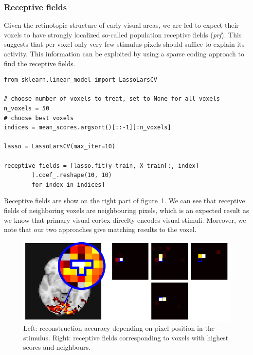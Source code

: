 \documentclass{frontiersSCNS} %
\begin{document}
\subsubsection{Receptive fields}
Given the retinotopic structure of early visual areas, we are led to expect their voxels to have strongly localized so-called population receptive fields (\textit{prf}). This suggests that per voxel only very few stimulus pixels should suffice to explain its activity. This information can be exploited by using a sparse coding approach to find the receptive fields.

\begin{lstlisting}
from sklearn.linear_model import LassoLarsCV

# choose number of voxels to treat, set to None for all voxels
n_voxels = 50
# choose best voxels
indices = mean_scores.argsort()[::-1][:n_voxels]

lasso = LassoLarsCV(max_iter=10)

receptive_fields = [lasso.fit(y_train, X_train[:, index]
        ).coef_.reshape(10, 10)
        for index in indices]

\end{lstlisting}

Receptive fields are show on the right part of figure~\ref{fig:encoding}. We can
see that receptive fields of neighboring voxels are neighbouring pixels, which
is an expected result as we know that primary visual cortex direclty encodes
visual stimuli. Moreover, we note that our two approaches give matching results 
to the voxel.

\begin{figure}[hbtp]
  \begin{center}
    \includegraphics[width=\linewidth]{img/miyawaki/figure_encoding}
  \end{center}
  \caption{Left: reconstruction accuracy depending on pixel
           position in the stimulus. Right: receptive fields corresponding to
       voxels with highest scores and neighbours.}
  \label{fig:encoding}
\end{figure}
\end{document}
